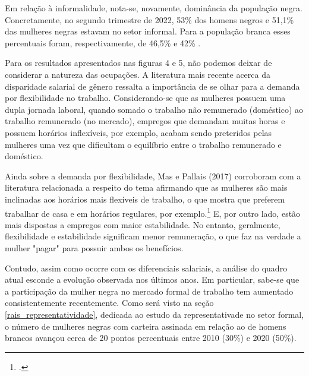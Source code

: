 \documentclass[12pt]{article}
\begin{document}
\par Em relação à informalidade, nota-se, novamente, dominância da população negra. Concretamente, no segundo trimestre de 2022, 53\% dos homens negros e 51,1\% das mulheres negras estavam no setor informal. Para a população branca esses percentuais foram, respectivamente, de 46,5\%  e 42\% . 

\par Para os resultados apresentados nas figuras 4 e 5, não podemos deixar de considerar a natureza das ocupações. A literatura mais recente acerca da disparidade salarial de gênero ressalta a importância de se olhar para a demanda por flexibilidade no trabalho. Considerando-se que as mulheres possuem uma dupla jornada laboral, quando somado o trabalho não remunerado (doméstico) ao trabalho remunerado (no mercado), empregos que demandam muitas horas e possuem horários inflexíveis, por exemplo, acabam sendo preteridos pelas mulheres uma vez que dificultam o equilíbrio entre o trabalho remunerado e doméstico. 

\par Ainda sobre a demanda por flexibilidade, Mas e Pallais (2017) corroboram com a literatura relacionada a respeito do tema afirmando que as mulheres são mais inclinadas aos horários mais flexíveis de trabalho, o que mostra que preferem trabalhar de casa e em horários regulares, por exemplo.\footcite{maspallais2017} E, por outro lado,  estão mais dispostas a empregos com maior estabilidade. No entanto, geralmente, flexibilidade e estabilidade significam menor remuneração, o que faz na verdade a mulher "pagar" para possuir ambos os benefícios. 

\par Contudo, assim como ocorre com os diferenciais salariais, a análise do quadro atual esconde a evolução observada nos últimos anos. Em particular, sabe-se que a participação da mulher negra no mercado formal de trabalho tem aumentado consistentemente recentemente. Como será visto na seção \ref{rais_representatividade}, dedicada ao estudo da representativade no setor formal, o número de mulheres negras com carteira assinada em relação ao de homens brancos avançou cerca de 20 pontos percentuais entre 2010 (30\%) e 2020 (50\%).
\end{document}
